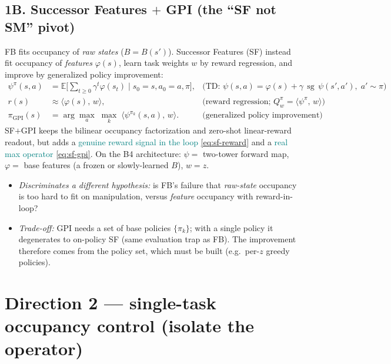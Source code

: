 \documentclass[11pt]{article}
\newcommand{\sg}{\operatorname{sg}}                 %
\newcommand{\E}{\mathbb{E}}
\newcommand{\inner}[2]{\langle #1,\, #2\rangle}
\newcommand{\Bmap}{B}                                %
\newcommand{\good}[1]{\textcolor{teal}{#1}}
\begin{document}
\subsection*{1B. Successor Features $+$ GPI (the ``SF not SM'' pivot)}
FB fits occupancy of \emph{raw states} ($\Bmap=\Bmap(s')$). Successor Features
(SF) instead fit occupancy of \emph{features} $\varphi(s)$, learn task weights
$w$ by reward regression, and improve by generalized policy improvement:
\begin{align}
  \psi^{\pi}(s,a) &= \E\!\Big[\textstyle\sum_{t\ge0}\gamma^{t}\varphi(s_{t})\;\Big|\;s_0{=}s,a_0{=}a,\pi\Big],
   &\text{(TD: } \psi(s,a)=\varphi(s)+\gamma\,\sg\,\psi(s',a'),\; a'\sim\pi) \label{eq:sf}\\
  r(s) &\approx \inner{\varphi(s)}{w},
   &\text{(reward regression; } Q^{\pi}_w=\inner{\psi^\pi}{w}) \label{eq:sf-reward}\\
  \pi_{\mathrm{GPI}}(s) &= \arg\max_{a}\;\max_{k}\;\inner{\psi^{\pi_k}(s,a)}{w}.
   &\text{(generalized policy improvement)} \label{eq:sf-gpi}
\end{align}
SF$+$GPI keeps the bilinear occupancy factorization and zero-shot linear-reward
readout, but adds a \good{genuine reward signal in the loop}
\eqref{eq:sf-reward} and a \good{real max operator} \eqref{eq:sf-gpi}. On the B4
architecture: $\psi=$ two-tower forward map, $\varphi=$ base features (a frozen
or slowly-learned $\Bmap$), $w=z$.
\begin{itemize}[leftmargin=1.4em,itemsep=1pt]
  \item \emph{Discriminates a different hypothesis:} is FB's failure that
        \emph{raw-state} occupancy is too hard to fit on manipulation, versus
        \emph{feature} occupancy with reward-in-loop?
  \item \emph{Trade-off:} GPI needs a set of base policies $\{\pi_k\}$; with a
        single policy it degenerates to on-policy SF (same evaluation trap as
        FB). The improvement therefore comes from the policy set, which must be
        built (e.g.\ per-$z$ greedy policies).
\end{itemize}

\section{Direction 2 --- single-task occupancy control (isolate the operator)}
\end{document}
